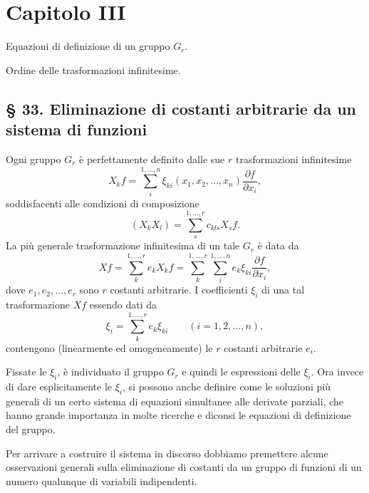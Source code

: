 \documentclass[11pt]{book}
\begin{document}
\chapter*{Capitolo III}

\begin{center}
\begin{minipage}{0.88\linewidth}
\centering
Equazioni di definizione di un gruppo $G_r$.\par
Ordine delle trasformazioni infinitesime.
\end{minipage}
\end{center}

\section*{\S{} 33. Eliminazione di costanti arbitrarie da un sistema di funzioni}

Ogni gruppo $G_r$ è perfettamente definito dalle sue $r$ trasformazioni infinitesime
\[
 X_k f=\sum\limits_i^{1,\ldots,n}\xi_{ki}(x_1,x_2,\ldots,x_n)\frac{\partial f}{\partial x_i},
\]
soddisfacenti alle condizioni di composizione
\[
 (X_kX_l)=\sum\limits_s^{1,\ldots,r}c_{kls}X_sf.
\]
La più generale trasformazione infinitesima di un tale $G_r$ è data da
\[
 Xf=\sum\limits_k^{1,\ldots,r}e_kX_kf
   =\sum\limits_k^{1,\ldots,r}\sum\limits_i^{1,\ldots,n}
     e_k\xi_{ki}\frac{\partial f}{\partial x_i},
\]
dove $e_1,e_2,\ldots,e_r$ sono $r$ costanti arbitrarie. I coefficienti $\xi_i$ di una tal trasformazione $Xf$ essendo dati da
\[
 \xi_i=\sum\limits_k^{1,\ldots,r}e_k\xi_{ki}
 \qquad (i=1,2,\ldots,n),
\]
contengono (linearmente ed omogeneamente) le $r$ costanti arbitrarie $e_i$.

Fissate le $\xi_i$, è individuato il gruppo $G_r$ e quindi le espressioni delle $\xi_i$. Ora invece di dare esplicitamente le $\xi_i$, si possono anche definire come le soluzioni più generali di un certo sistema di equazioni simultanee alle derivate parziali, che hanno grande importanza in molte ricerche e diconsi le equazioni di definizione del gruppo.

Per arrivare a costruire il sistema in discorso dobbiamo premettere alcune osservazioni generali sulla eliminazione di costanti da un gruppo di funzioni di un numero qualunque di variabili indipendenti.
\end{document}
